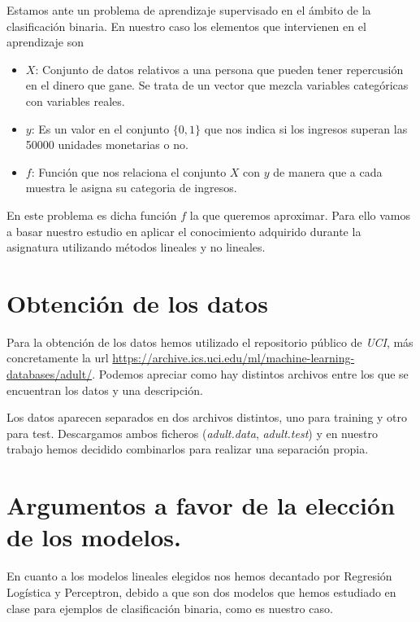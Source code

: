 \documentclass[a4paper,11pt]{article}
\begin{document}
Estamos ante un problema de aprendizaje supervisado en el ámbito de la
clasificación binaria. En nuestro caso los elementos que intervienen en el
aprendizaje son 

\begin{itemize}
    \item $X$: Conjunto de datos relativos a una persona que pueden tener
    repercusión en el dinero que gane. Se trata de un vector que mezcla
    variables categóricas con variables reales.
    \item $y$: Es un valor en el conjunto $\{0,1\}$ que nos indica si los
    ingresos superan las 50000 unidades monetarias o no.
    \item $f$: Función que nos relaciona el conjunto $X$ con $y$ de manera que a
    cada muestra le asigna su categoria de ingresos.
\end{itemize}

En este problema es dicha función $f$ la que queremos aproximar. Para ello vamos
a basar nuestro estudio en aplicar el conocimiento adquirido durante la
asignatura utilizando métodos lineales y no lineales.

\section{Obtención de los datos}

Para la obtención de los datos hemos utilizado el repositorio público de
\textit{UCI}, más concretamente la url
\href{https://archive.ics.uci.edu/ml/machine-learning-databases/adult/}{https://archive.ics.uci.edu/ml/machine-learning-databases/adult/}.
Podemos apreciar como hay distintos archivos entre los que se encuentran los
datos y una descripción. 

Los datos aparecen separados en dos archivos distintos, uno para training y otro
para test. Descargamos ambos ficheros (\textit{adult.data}, \textit{adult.test})
y en nuestro trabajo hemos decidido combinarlos para realizar una separación
propia.

\section{Argumentos a favor de la elección de los modelos.}

En cuanto a los modelos lineales elegidos nos hemos decantado por Regresión
Logística y Perceptron, debido a que son dos modelos que hemos estudiado en
clase para ejemplos de clasificación binaria, como es nuestro caso. \\
\end{document}
